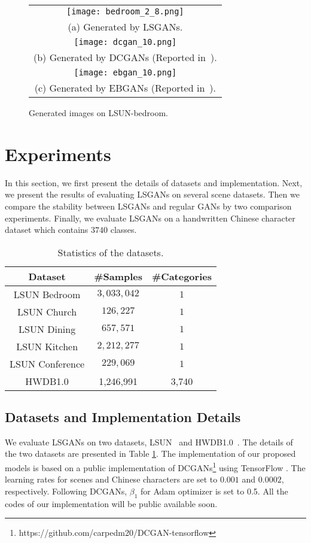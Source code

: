 \documentclass{article} %
\begin{document}
\begin{figure*}[t]
\centering
\begin{tabular}{c}
 \texttt{[image: bedroom\_2\_8.png]}
\\
(a) Generated by LSGANs.
\\
 \texttt{[image: dcgan\_10.png]}
\\
(b) Generated by DCGANs (Reported in~\cite{Radford2015}).
\\
 \texttt{[image: ebgan\_10.png]}
\\
(c) Generated by EBGANs (Reported in~\cite{Zhao2016}).
\end{tabular}
\caption{
Generated images on LSUN-bedroom.
}
\label{fig:bedroom_cmp}
\end{figure*}

\section{Experiments}
\label{sec:experiments}

In this section, we first present the details of datasets and implementation. Next, we present the results of evaluating LSGANs on several scene datasets. Then we compare the stability between LSGANs and regular GANs by two comparison experiments. Finally, we evaluate LSGANs on a handwritten Chinese character dataset which contains $3740$ classes.


\begin{table}[h]
\small
\centering
\caption{Statistics of the datasets.}
\begin{tabular}{ccc}
\hline
Dataset & \#Samples & \#Categories\\
\hline
LSUN Bedroom&$3,033,042$&$1$\\
LSUN Church&$126,227$&$1$\\
LSUN Dining&$657,571$&$1$\\
LSUN Kitchen&$2,212,277$&$1$\\
LSUN Conference&$229,069$&$1$\\
HWDB1.0&1,246,991&3,740\\
\hline
\end{tabular}
\label{dataset}
\end{table}
\subsection{Datasets and Implementation Details}
We evaluate LSGANs on two datasets, LSUN~\cite{Yu2015} and HWDB1.0~\cite{Liu2011}. The details of the two datasets are presented in Table \ref{dataset}. The implementation of our proposed models is based on a public implementation of DCGANs\footnote{https://github.com/carpedm20/DCGAN-tensorflow} using TensorFlow \cite{tensorflow2015}. The learning rates for scenes and Chinese characters are set to $0.001$ and $0.0002$, respectively. Following DCGANs, $\beta_1$ for Adam optimizer is set to 0.5. All the codes of our implementation will be public available soon.
\end{document}
